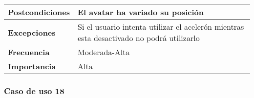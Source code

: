 \begin{tabularx}{\columnwidth}{l|l}
\begin{minipage}{0.25\columnwidth}
\textbf{Postcondiciones} 
\end{minipage}
&
\begin{minipage}{0.65\columnwidth}
El avatar ha variado su posición
\end{minipage}
\\ \hline

\begin{minipage}{0.25\columnwidth}
\textbf{Excepciones} 
\end{minipage}
&
\begin{minipage}{0.65\columnwidth}
Si el usuario intenta utilizar el acelerón mientras esta desactivado no podrá utilizarlo 
\end{minipage}
\\ \hline

\begin{minipage}{0.25\columnwidth}
\textbf{Frecuencia} 
\end{minipage}
&
\begin{minipage}{0.65\columnwidth}
Moderada-Alta
\end{minipage}
\\ \hline

\begin{minipage}{0.25\columnwidth}
\textbf{Importancia} 
\end{minipage}
&
\begin{minipage}{0.65\columnwidth}
Alta
\end{minipage}
\\ \hline
\end{tabularx}

\subsubsection{Caso de uso 18}

